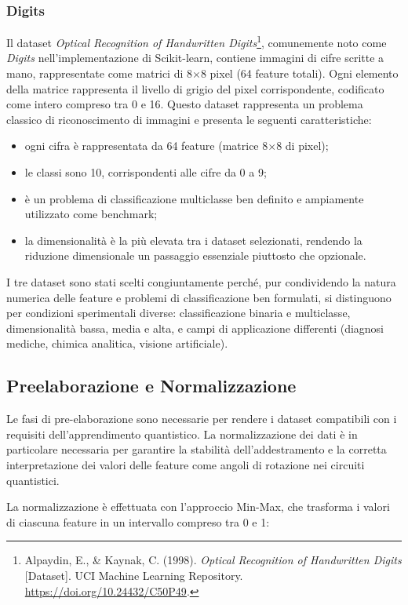 \subsubsection{Digits}
Il dataset \textit{Optical Recognition of Handwritten Digits}\footnote{Alpaydin, E., \& Kaynak, C. (1998). \textit{Optical Recognition of Handwritten Digits} [Dataset]. UCI Machine Learning Repository. \url{https://doi.org/10.24432/C50P49}.}, comunemente noto come \textit{Digits} nell'implementazione di Scikit-learn, contiene immagini di cifre scritte a mano, rappresentate come matrici di 8$\times$8 pixel (64 feature totali). Ogni elemento della matrice rappresenta il livello di grigio del pixel corrispondente, codificato come intero compreso tra 0 e 16. Questo dataset rappresenta un problema classico di riconoscimento di immagini e presenta le seguenti caratteristiche:
\begin{itemize}
    \item ogni cifra è rappresentata da 64 feature (matrice 8$\times$8 di pixel);
    \item le classi sono 10, corrispondenti alle cifre da 0 a 9;
    \item è un problema di classificazione multiclasse ben definito e ampiamente utilizzato come benchmark;
    \item la dimensionalità è la più elevata tra i dataset selezionati, rendendo la riduzione dimensionale un passaggio essenziale piuttosto che opzionale.
\end{itemize}

I tre dataset sono stati scelti congiuntamente perché, pur condividendo la natura numerica delle feature e problemi di classificazione ben formulati, si distinguono per condizioni sperimentali diverse: classificazione binaria e multiclasse, dimensionalità bassa, media e alta, e campi di applicazione differenti (diagnosi mediche, chimica analitica, visione artificiale).

\subsection{Preelaborazione e Normalizzazione}
Le fasi di pre-elaborazione sono necessarie per rendere i dataset compatibili con i requisiti dell'apprendimento quantistico.
La normalizzazione dei dati è in particolare necessaria per garantire la stabilità dell'addestramento e la corretta interpretazione dei valori delle feature come angoli di rotazione nei circuiti quantistici.

La normalizzazione è effettuata con l'approccio Min-Max, che trasforma i valori di ciascuna feature in un intervallo compreso tra 0 e 1:

